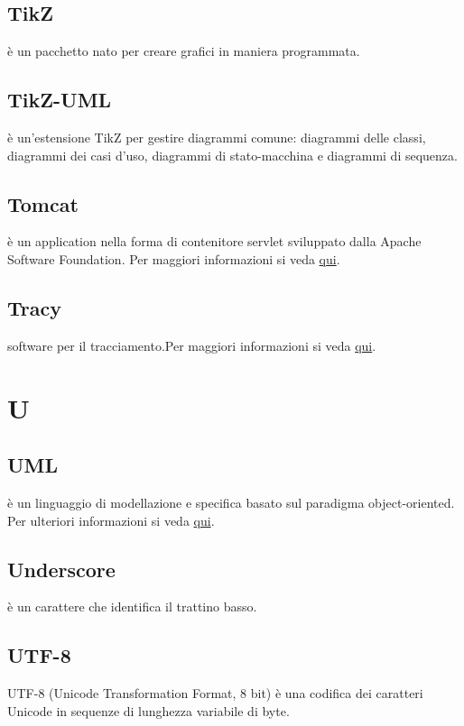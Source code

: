 \documentclass[12pt,a4paper]{article}
\begin{document}
\subsection{TikZ} 
è un pacchetto  nato per creare grafici in maniera programmata.

\subsection{TikZ-UML} 
è un'estensione TikZ per gestire diagrammi  comune: diagrammi delle classi, diagrammi dei casi d'uso, diagrammi di stato-macchina e diagrammi di sequenza.

\subsection{Tomcat} 
è un application  nella forma di contenitore servlet  sviluppato dalla Apache Software Foundation. Per maggiori informazioni si veda \href{https://it.wikipedia.org/wiki/Apache_Tomcat}{qui}.

\subsection{Tracy} 
software  per il tracciamento.Per maggiori informazioni si veda \href{http://tracy-tpiga.rhcloud.com/tracy/}{qui}.


\newpage

\section{U}


\subsection{UML} 
è un linguaggio di modellazione e specifica basato sul paradigma object-oriented. Per ulteriori informazioni si veda \href{http://it.wikipedia.org/wiki/Unified_Modeling_Language}{qui}.

\subsection{Underscore} 
è un carattere che identifica il trattino basso.

\subsection{UTF-8}
UTF-8 (Unicode Transformation Format, 8 bit) è una codifica dei caratteri Unicode in sequenze di lunghezza variabile di byte.
\end{document}
